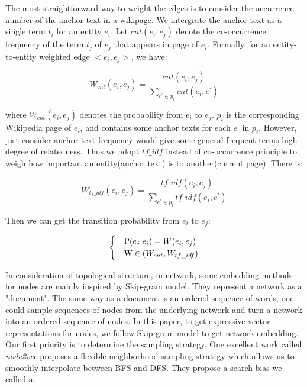 The most straightforward way to weight the edges is to consider the occurrence number of the anchor text in a wikipage.
We intergrate the anchor text as a single term $t_i$ for an entity $e_i$.
Let $cnt(e_i, e_j)$ denote the co-occurrence frequency of
the term $t_j$ of $e_j$ that appears in page of $e_i$. Formally, for an entity-to-entity weighted edge $<e_i, e_j>$, we have:

\begin{small}
    \begin{equation}
        \nonumber
        \label{cng_formula}
        W_{cnt}(e_i, e_j) = \frac{cnt(e_i, e_j)}{\sum_{e^{'} \in p_i}^{ }cnt(e_i, e^{'})}
    \end{equation}
\end{small}where $W_{cnt}(e_i, e_j)$ denotes the probability from $e_i$ to $e_j$. $p_i$ is the corresponding Wikipedia page of $e_i$,
and contains some anchor texts for each $e^{'}$ in $p_i$.
However, just consider anchor text frequency would give some general frequent terms high degree of relatedness.
Thus we adopt $tf\_idf$ instead of co-occurrence principle to weigh how important an entity(anchor text) is to
another(current page). There is:

\begin{small}
    \begin{equation}
        \nonumber
        \label{w_tf-idf_formula}
        W_{tf\_idf}(e_i, e_j) = \frac{tf\_idf(e_i, e_j)}{\sum_{e^{'} \in p_i}^{ }tf\_idf(e_i, e^{'})}
    \end{equation}
\end{small} Then we can get the transition probability from $e_i$ to $e_j$:

\begin{small}
    \begin{equation}
        \nonumber
        \label{pr_formula}
        \begin{cases}
            & \text  P(e_j|e_i) = W(e_i, e_j)\\
            & \text W \in (W_{cnt}, W_{tf\_idf})
        \end{cases}
    \end{equation}
\end{small} 

In consideration of topological structure, in network, some embedding methods\cite{kdd/Perozzi14,kdd/GroverL16} for nodes
are mainly inspired by Skip-gram model. They represent a network as a "document". The same
way as a document is an ordered sequence of words, one could sample sequences of nodes from the underlying network and turn
a network into an ordered sequence of nodes. In this paper, to get expressive vector representations for nodes, we follow Skip-gram model
to get network embedding. Our first priority is to determine the sampling strategy. One excellent work called \emph{node2vec}\cite{kdd/GroverL16}
proposes a flexible neighborhood sampling strategy which allows us to smoothly interpolate between BFS and DFS.
They propose a search bias we called $\mathrm{a}$:

